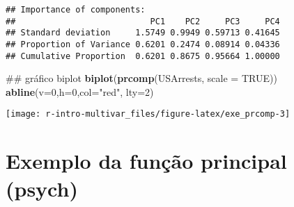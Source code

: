 \documentclass[]{book}
\newenvironment{Shaded}{\begin{snugshade}}{\end{snugshade}}
\newcommand{\KeywordTok}[1]{\textcolor[rgb]{0.13,0.29,0.53}{\textbf{{#1}}}}
\newcommand{\DataTypeTok}[1]{\textcolor[rgb]{0.13,0.29,0.53}{{#1}}}
\newcommand{\DecValTok}[1]{\textcolor[rgb]{0.00,0.00,0.81}{{#1}}}
\newcommand{\StringTok}[1]{\textcolor[rgb]{0.31,0.60,0.02}{{#1}}}
\newcommand{\CommentTok}[1]{\textcolor[rgb]{0.56,0.35,0.01}{\textit{{#1}}}}
\newcommand{\OtherTok}[1]{\textcolor[rgb]{0.56,0.35,0.01}{{#1}}}
\newcommand{\NormalTok}[1]{{#1}}
\begin{document}
\begin{verbatim}
## Importance of components:
##                           PC1    PC2     PC3     PC4
## Standard deviation     1.5749 0.9949 0.59713 0.41645
## Proportion of Variance 0.6201 0.2474 0.08914 0.04336
## Cumulative Proportion  0.6201 0.8675 0.95664 1.00000
\end{verbatim}

\begin{Shaded}
\begin{Highlighting}[]
\NormalTok{## gráfico biplot}
\KeywordTok{biplot}\NormalTok{(}\KeywordTok{prcomp}\NormalTok{(USArrests, }\DataTypeTok{scale =} \OtherTok{TRUE}\NormalTok{))}
\KeywordTok{abline}\NormalTok{(}\DataTypeTok{v=}\DecValTok{0}\NormalTok{,}\DataTypeTok{h=}\DecValTok{0}\NormalTok{,}\DataTypeTok{col=}\StringTok{"red"}\NormalTok{, }\DataTypeTok{lty=}\DecValTok{2}\NormalTok{)}
\end{Highlighting}
\end{Shaded}

\begin{center}\texttt{[image: r-intro-multivar\_files/figure-latex/exe\_prcomp-3]} \end{center}

\section{Exemplo da função principal
(psych)}\label{exemplo-da-funcao-principal-psych}

\begin{Shaded}
\end{Shaded}
\end{document}
